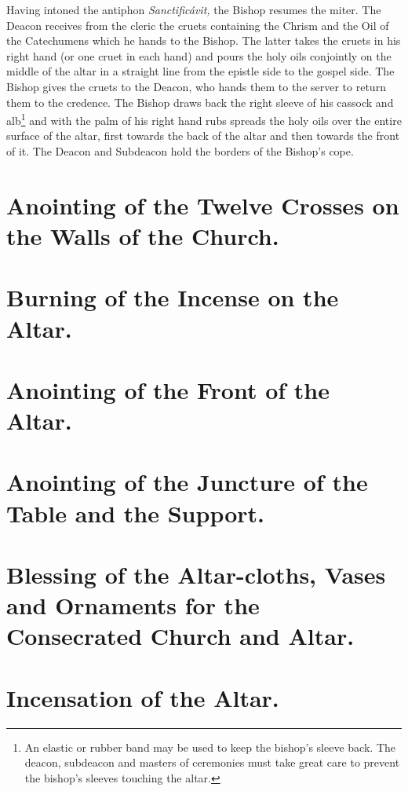 \documentclass[letterpaper]{report}
\begin{document}
{\rubric Having intoned the antiphon \textit{Sanctificávit,} the Bishop resumes
the miter. The Deacon receives from the cleric the cruets containing the Chrism
and the Oil of the Catechumens which he hands to the Bishop. The latter takes
the cruets in his right hand (or one cruet in each hand) and pours the holy
oils conjointly on the middle of the altar in a straight line from the epistle
side to the gospel side. The Bishop gives the cruets to the Deacon, who hands
them to the server to return them to the credence. The Bishop draws back the
right sleeve of his cassock and alb\footnote{An elastic or rubber band may be
used to keep the bishop's sleeve back. The deacon, subdeacon and masters of
ceremonies must take great care to prevent the bishop's sleeves touching the
altar.} and with the palm of his right hand rubs spreads the holy oils over the
entire surface of the altar, first towards the back of the altar and then
towards the front of it. The Deacon and Subdeacon hold the borders of the
Bishop's cope.

\rubric 







\section{Anointing of the Twelve Crosses on the Walls of the Church.}

\section{Burning of the Incense on the Altar.}

\section{Anointing of the Front of the Altar.}

\section{Anointing of the Juncture of the Table and the Support.}

\section{Blessing of the Altar-cloths, Vases and Ornaments for the Consecrated Church and Altar.}

\section{Incensation of the Altar.}

}
\end{document}
